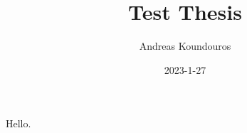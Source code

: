 \documentclass[12pt]{article}
\title{Test Thesis}
\author{Andreas Koundouros}
\date{2023-1-27}
\begin{document}
\maketitle

Hello.
\end{document}
